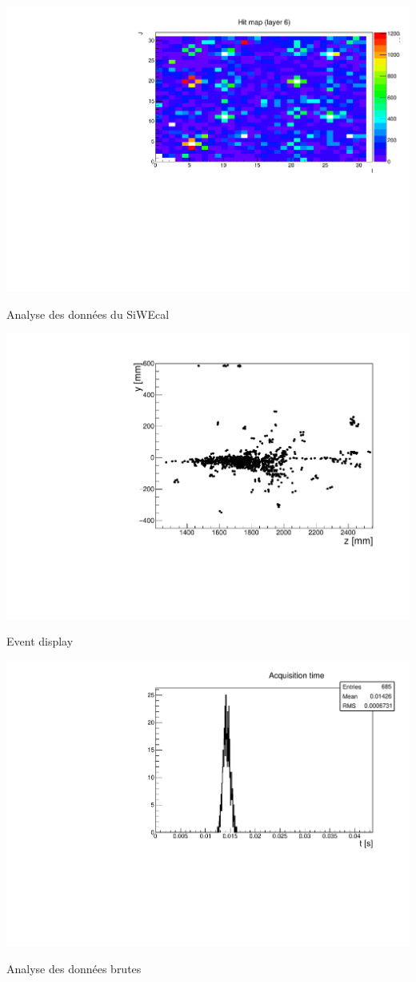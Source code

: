 \documentclass[8pt]{beamer}
\begin{document}
\begin{frame}
\begin{minipage}{0.48\linewidth}
      \end{minipage}
      \begin{minipage}{0.48\linewidth}
        \centering \includegraphics[width=0.6\linewidth]{DQM_SDHCAL_ECAL_HitMap6_I732891.pdf}
        \begin{center} Analyse des données du SiWEcal \end{center}
      \end{minipage}

      \begin{minipage}{0.48\linewidth}
        \centering \includegraphics[width=0.6\linewidth]{DQM_SDHCAL_Shower_pi-_70GeV_I732792.pdf}
        \begin{center} Event display \end{center}
      \end{minipage}
      \begin{minipage}{0.48\linewidth}
        \centering \includegraphics[width=0.6\linewidth]{DQM_SDHCAL_AcquisitionTime_I732889.pdf}
        \begin{center} Analyse des données brutes \end{center}
      \end{minipage}


\end{frame}
\end{document}
